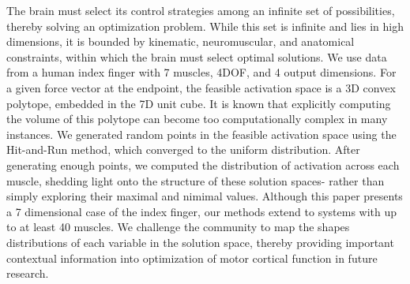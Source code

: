 
The brain must select its control strategies among an infinite set of possibilities, thereby solving an optimization problem. 
While this set is infinite and lies in high dimensions, it is bounded by kinematic, neuromuscular, and anatomical constraints, within which the brain must select optimal solutions. 
We use data from a human index finger with 7 muscles, 4DOF, and 4 output dimensions. For a given force vector at the endpoint, the feasible activation space is a 3D convex polytope, embedded in the 7D unit cube.
It is known that explicitly computing the volume of this polytope can become too computationally complex in many instances. 
We generated random points in the feasible activation space using the Hit-and-Run method, which converged to the uniform distribution. 
After generating enough points, we computed the distribution of activation across each muscle, shedding light onto the structure of these solution spaces- rather than simply exploring their maximal and nimimal values. 
Although this paper presents a 7 dimensional case of the index finger, our methods extend to systems with up to at least 40 muscles. We challenge the community to map the shapes distributions of each variable in the solution space, thereby providing important contextual information into optimization of motor cortical function in future research.
